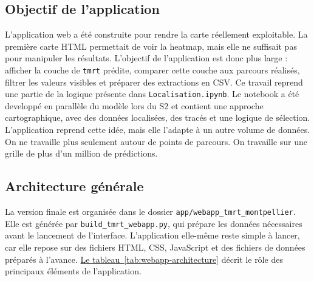 \documentclass{article}
\begin{document}
\subsection{Objectif de l'application}

L'application web a été construite pour rendre la carte réellement exploitable. La première carte HTML permettait de voir la heatmap, mais elle ne suffisait pas pour manipuler les résultats. L'objectif de l'application est donc plus large : afficher la couche de \texttt{tmrt} prédite, comparer cette couche aux parcours réalisés, filtrer les valeurs visibles et préparer des extractions en CSV.
Ce travail reprend une partie de la logique présente dans \texttt{Localisation.ipynb}. Le notebook a été developpé en parallèle du modèle lors du S2 et contient une approche cartographique, avec des données localisées, des tracés et une logique de sélection. L'application reprend cette idée, mais elle l'adapte à un autre volume de données. On ne travaille plus seulement autour de points de parcours. On travaille sur une grille de plus d'un million de prédictions.

\subsection{Architecture générale}

La version finale est organisée dans le dossier \texttt{app/webapp\_tmrt\_montpellier}. Elle est générée par \texttt{build\_tmrt\_webapp.py}, qui prépare les données nécessaires avant le lancement de l'interface. L'application elle-même reste simple à lancer, car elle repose sur des fichiers HTML, CSS, JavaScript et des fichiers de données préparés à l'avance.
\hyperref[tab:webapp-architecture]{Le tableau~\ref{tab:webapp-architecture}} décrit le rôle des principaux éléments de l'application.
\end{document}
